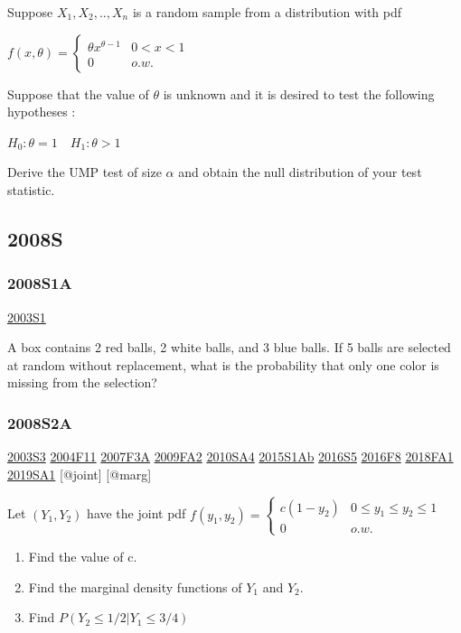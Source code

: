 \documentclass[6pt,twocolumn,Portrait]{article}
\begin{document}
Suppose \(X_1,X_2,..,X_n\) is a random sample from a distribution with
pdf

\(f(x,\theta)=\begin{cases}\theta x^{\theta-1}& 0<x<1\\0& o.w.\end{cases}\)

Suppose that the value of \(\theta\) is unknown and it is desired to
test the following hypotheses :

\(H_0:\theta=1\quad H_1 :\theta>1\)

Derive the UMP test of size \(\alpha\) and obtain the null distribution
of your test statistic.

\hypertarget{s-2}{%
\subsection{2008S}\label{s-2}}

\hypertarget{s1a}{%
\subsubsection{2008S1A}\label{s1a}}

\protect\hyperlink{s1}{2003S1}

A box contains 2 red balls, 2 white balls, and 3 blue balls. If 5 balls
are selected at random without replacement, what is the probability that
only one color is missing from the selection?

\hypertarget{s2a}{%
\subsubsection{2008S2A}\label{s2a}}

\protect\hyperlink{s3}{2003S3} \protect\hyperlink{f11}{2004F11}
\protect\hyperlink{f3a}{2007F3A} \protect\hyperlink{fa2}{2009FA2}
\protect\hyperlink{sa4-1}{2010SA4} \protect\hyperlink{s1ab}{2015S1Ab}
\protect\hyperlink{s5-4}{2016S5} \protect\hyperlink{f8-4}{2016F8}
\protect\hyperlink{fa1-4}{2018FA1} \protect\hyperlink{sa1-3}{2019SA1}
{[}@joint{]} {[}@marg{]}

Let \((Y_1,Y_2)\) have the joint pdf
\(f(y_1,y_2)=\begin{cases}c(1-y_2)&0\le y_1\le y_2\le 1\\0& o.w.\end{cases}\)

\begin{enumerate}
\def\labelenumi{(\alph{enumi})}
\item
  Find the value of c.
\item
  Find the marginal density functions of \(Y_1\) and \(Y_2\).
\item
  Find \(P(Y_2\le1/2|Y_1\le3/4)\)
\end{enumerate}
\end{document}
